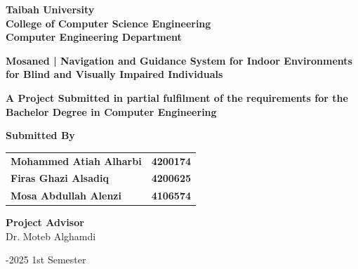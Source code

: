 \begin{titlepage}
    {\titlefont \textbf{Taibah University}}\\
    {\titlefont \textbf{College of Computer Science Engineering}}\\
    {\titlefont \textbf{Computer Engineering Department}}\\
    
    \vspace{1.8cm}
    
    {\titlefont \textbf{Mosaned | Navigation and Guidance System for Indoor Environments for Blind and Visually Impaired Individuals}}
    
    \vspace{1.8cm}

    {\titlefont \fontsize{14}{16} \textbf{A Project Submitted in partial fulfilment of the requirements for the Bachelor Degree in Computer Engineering}}
    \vspace{1.8cm}
    
    \vspace{1.2cm}
    
    \begin{minipage}{\textwidth}
    	\centering
    	{\titlefont \textbf{Submitted By}}\\
    	\vspace{1cm}
    	
    	\begin{tabular}{@{}l@{\hskip 4cm}r@{}}
    		{\titlefont \textbf{Mohammed Atiah Alharbi}} & {\titlefont \textbf{4200174}} \\
    		{\titlefont \textbf{Firas Ghazi Alsadiq}} & {\titlefont \textbf{4200625}} \\
    		{\titlefont \textbf{Mosa Abdullah Alenzi}} & {\titlefont \textbf{4106574}} \\
    	\end{tabular}
    \end{minipage}
    
    \vspace{1.8cm}

    {\selectfont\fontsize{14}{16}\normalfont
    \textbf{Project Advisor}\\
    Dr. Moteb Alghamdi
    }
    
    \vspace{2cm}

    {\selectfont\fontsize{14}{16}-2025  1st Semester
    }

\end{titlepage}
